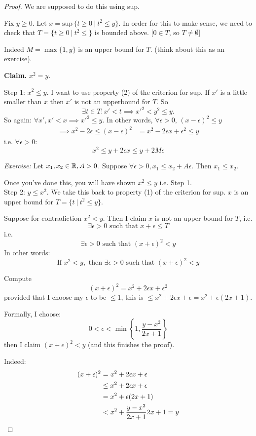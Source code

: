 \documentclass[10pt]{scrartcl}
\begin{document}
\begin{proof}
We are supposed to do this using sup. 

Fix  $y \geq 0$. Let $x = \mathrm{sup}\,\{t \geq 0~|~ t^2 \leq y\}$. In order for this to make sense, we need to check that $T = \{t \geq 0~|~ t^2 \leq\}$ is bounded above. [$0 \in T$, so $T \neq \emptyset$]

Indeed $M = \max\{1,y\}$ is an upper bound for $T$. (think about this as an exercise). 

\textbf{Claim.} $x^2 =y$. 

Step 1: $x^2 \leq y$. I want to use property (2) of the criterion for sup. If $x'$ is a little smaller than $x$ then $x'$ is not an upperbound for $T$. So \[\exists t \in T: x' < t \implies x'^2 < y^2 \leq y.\] So again: $\forall x', x'< x \implies x'^2 \leq y$. In other words, $\forall \epsilon >0,\,(x-\epsilon)^2 \leq y$
\[\begin{aligned}
\implies x^2 - 2\epsilon \leq (x-\epsilon)^2 &= x^2 - 2\epsilon x + \epsilon^2 \leq y	
\end{aligned}\]
i.e. 
$\forall \epsilon >0:$
\[x^2 \leq y + 2\epsilon x \leq y + 2M\epsilon\]

\emph{Exercise:} Let $x_1,x_2 \in\mathbb{R}, A >0$. Suppose $\forall \epsilon >0, x_1\leq x_2 + A\epsilon$. Then $x_1 \leq x_2$. 

Once you've done this, you will have shown $x^2\leq y$ i.e. Step 1.\\ 

Step 2: $y \leq x^2$. We take this back to property (1) of the criterion for sup. $x$ is an upper bound for $T = \{ t ~|~ t^2 \leq y\}$. 

Suppose for contradiction $x^2 < y$. Then I claim $x$ is not an upper bound for $T$, i.e. 
\[\exists \epsilon >0 \text{ such that } x + \epsilon \leq T\]
i.e. 
\[\exists \epsilon >0 \text{ such that } (x+\epsilon)^2 <y\]
In other words:
\[\text{If } x^2 < y, \text{ then }\exists \epsilon >0 \text{ such that } (x+\epsilon)^2 < y\]

Compute
\[(x+\epsilon)^2 = x^2 + 2\epsilon x + \epsilon^2\]
provided that I choose my $\epsilon$ to be $\leq 1$, this is $\leq x^2 + 2\epsilon x + \epsilon = x^2 + \epsilon(2x + 1)$. 

Formally, I choose: 
\[0 < \epsilon < \min\left\{1,\frac{y-x^2}{2x+1}\right\}\]
then I claim $(x+\epsilon)^2 < y$ (and this finishes the proof). 

Indeed: 
\begin{align*}
  (x+\epsilon)^2 &= x^2 + 2\epsilon x + \epsilon\\
  &\leq x^2 + 2\epsilon x + \epsilon \\
  &= x^2 + \epsilon (2x + 1)\\
  &< x^2 + \frac{y-x^2}{2x+1}2x+1 = y\qedhere
\end{align*}
\end{proof}\vsp
\end{document}
